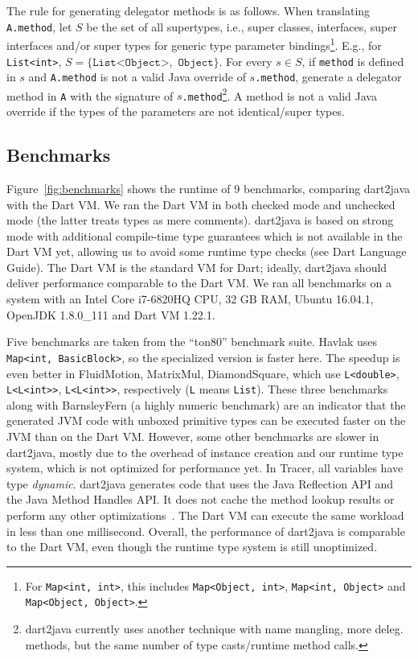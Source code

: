 \documentclass[sigplan]{acmart}
\begin{document}
The rule for generating delegator methods is as follows. When translating \texttt{A.method}, let $S$ be the set of all supertypes, i.e., super classes, interfaces, super interfaces and/or super types for generic type parameter bindings\footnote{For \texttt{Map<int, int>}, this includes \texttt{Map<Object, int>}, \texttt{Map<int, Object>} and \texttt{Map<Object, Object>}.}. E.g., for \texttt{List<int>}, $S=\{\texttt{List<Object>},$ $ \texttt{Object} \}$. For every $s \in S$, if \texttt{method} is defined in $s$ and \texttt{A.method} is not a valid Java override of \texttt{$s$.method}, generate a delegator method in \texttt{A} with the signature of \texttt{$s$.method}\footnote{dart2java currently uses another technique with name mangling, more deleg. methods, but the same number of type casts/runtime method calls.}. A method is not a valid Java override if the types of the parameters are not identical/super types.



\subsection{Benchmarks}
Figure~\ref{fig:benchmarks} shows the runtime of 9 benchmarks, comparing dart2java with the Dart VM. We ran the Dart VM in both checked mode and unchecked mode (the latter treats types as mere comments). dart2java is based on strong mode with additional compile-time type guarantees which is not available in the Dart VM yet, allowing us to avoid some runtime type checks (see Dart Language Guide). The Dart VM is the standard VM for Dart; ideally, dart2java should deliver performance comparable to the Dart VM. We ran all benchmarks on a system with an Intel Core i7-6820HQ CPU, 32 GB RAM, Ubuntu 16.04.1, OpenJDK 1.8.0\_111 and Dart VM 1.22.1.

Five benchmarks are taken from the ``ton80'' benchmark suite. Havlak uses \texttt{Map<int, BasicBlock>}, so the specialized version is faster here. The speedup is even better in FluidMotion, MatrixMul, DiamondSquare, which use \texttt{L<double>}, \texttt{L<L<int>{>}},  \texttt{L<L<int>{>}}, respectively (\texttt{L} means \texttt{List}). These three benchmarks along with BarnsleyFern (a highly numeric benchmark) are an indicator that the generated JVM code with unboxed primitive types can be executed faster on the JVM than on the Dart VM. However, some other benchmarks are slower in dart2java, mostly due to the overhead of instance creation and our runtime type system, which is not optimized for performance yet. In Tracer, all variables have type \emph{dynamic}. dart2java generates code that uses the Java Reflection API and the Java Method Handles API. It does not cache the method lookup results or perform any other optimizations~\cite{Marr:2015:ZMR:2737924.2737963}. The Dart VM can execute the same workload in less than one millisecond. Overall, the performance of dart2java is comparable to the Dart VM, even though the runtime type system is still unoptimized.
\end{document}
